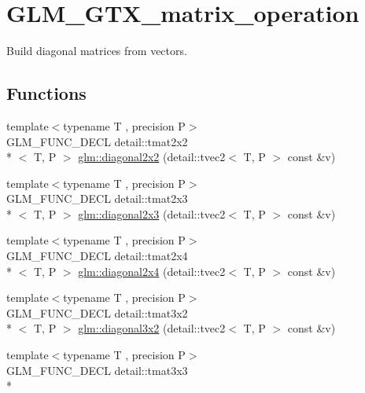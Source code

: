 \hypertarget{group__gtx__matrix__operation}{\section{G\-L\-M\-\_\-\-G\-T\-X\-\_\-matrix\-\_\-operation}
\label{group__gtx__matrix__operation}
}


Build diagonal matrices from vectors.  


\subsection*{Functions}
\begin{DoxyCompactItemize}
\item 
{\footnotesize template$<$typename T , precision P$>$ }\\G\-L\-M\-\_\-\-F\-U\-N\-C\-\_\-\-D\-E\-C\-L detail\-::tmat2x2\\*
$<$ T, P $>$ \hyperlink{group__gtx__matrix__operation_gae4177a43a89e6b4b7352f82198f2ea84}{glm\-::diagonal2x2} (detail\-::tvec2$<$ T, P $>$ const \&v)
\item 
{\footnotesize template$<$typename T , precision P$>$ }\\G\-L\-M\-\_\-\-F\-U\-N\-C\-\_\-\-D\-E\-C\-L detail\-::tmat2x3\\*
$<$ T, P $>$ \hyperlink{group__gtx__matrix__operation_ga873468c41cb29fb84a12a866549e0136}{glm\-::diagonal2x3} (detail\-::tvec2$<$ T, P $>$ const \&v)
\item 
{\footnotesize template$<$typename T , precision P$>$ }\\G\-L\-M\-\_\-\-F\-U\-N\-C\-\_\-\-D\-E\-C\-L detail\-::tmat2x4\\*
$<$ T, P $>$ \hyperlink{group__gtx__matrix__operation_gaf97e094855cc3c6186b879d045f67aca}{glm\-::diagonal2x4} (detail\-::tvec2$<$ T, P $>$ const \&v)
\item 
{\footnotesize template$<$typename T , precision P$>$ }\\G\-L\-M\-\_\-\-F\-U\-N\-C\-\_\-\-D\-E\-C\-L detail\-::tmat3x2\\*
$<$ T, P $>$ \hyperlink{group__gtx__matrix__operation_gabf8e8445e2884aeaa35f0ec32ba5bd01}{glm\-::diagonal3x2} (detail\-::tvec2$<$ T, P $>$ const \&v)
\item 
{\footnotesize template$<$typename T , precision P$>$ }\\G\-L\-M\-\_\-\-F\-U\-N\-C\-\_\-\-D\-E\-C\-L detail\-::tmat3x3\\*

\end{DoxyCompactItemize}
